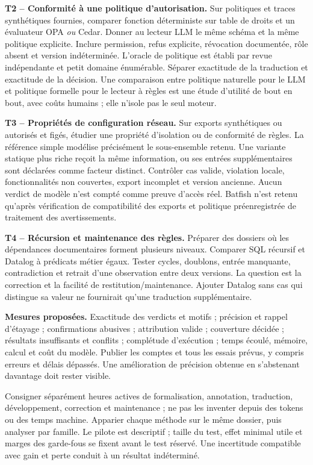 \documentclass[11pt,a4paper]{article}
\begin{document}
\textbf{T2 -- Conformité à une politique d'autorisation.} Sur politiques et
traces synthétiques fournies, comparer fonction déterministe sur table de
droits et un évaluateur OPA \emph{ou} Cedar. Donner au lecteur LLM le même
schéma et la même politique explicite. Inclure permission, refus explicite,
révocation documentée, rôle absent et version indéterminée. L'oracle de politique
est établi par revue indépendante et petit domaine énumérable. Séparer exactitude
de la traduction et exactitude de la décision. Une comparaison entre politique
naturelle pour le LLM et politique formelle pour le lecteur à règles est une étude d'utilité
de bout en bout, avec coûts humains ; elle n'isole pas le seul moteur.

\textbf{T3 -- Propriétés de configuration réseau.} Sur exports synthétiques
ou autorisés et figés, étudier une propriété d'isolation ou de conformité de
règles. La référence simple modélise précisément le sous-ensemble retenu.
Une variante statique plus riche reçoit la même information, ou ses entrées
supplémentaires sont déclarées comme facteur distinct. Contrôler cas valide,
violation locale, fonctionnalités non couvertes, export incomplet et version
ancienne. Aucun verdict de modèle n'est compté comme preuve d'accès réel.
Batfish n'est retenu qu'après vérification de compatibilité des exports et
politique préenregistrée de traitement des avertissements.

\textbf{T4 -- Récursion et maintenance des règles.} Préparer des dossiers où
les dépendances documentaires forment plusieurs niveaux. Comparer SQL récursif
et Datalog à prédicats métier égaux. Tester cycles, doublons, entrée manquante,
contradiction et retrait d'une observation entre deux versions. La question est
la correction et la facilité de restitution/maintenance. Ajouter Datalog sans
cas qui distingue sa valeur ne fournirait qu'une traduction supplémentaire.

\textbf{Mesures proposées.} Exactitude des verdicts et motifs ; précision
et rappel d'étayage ; confirmations abusives ; attribution valide ; couverture
décidée ; résultats insuffisants et conflits ; complétude d'exécution ; temps
écoulé, mémoire, calcul et coût du modèle. Publier les comptes et tous les
essais prévus, y compris erreurs et délais dépassés. Une amélioration de précision
obtenue en s'abstenant davantage doit rester visible.

Consigner séparément heures actives de formalisation, annotation, traduction,
développement, correction et maintenance ; ne pas les inventer depuis des
tokens ou des temps machine. Apparier chaque méthode sur le même dossier,
puis analyser par famille. Le pilote est descriptif ; taille du test, effet
minimal utile et marges des garde-fous se fixent avant le test réservé.
Une incertitude compatible avec gain et perte conduit à un résultat indéterminé.
\end{document}
